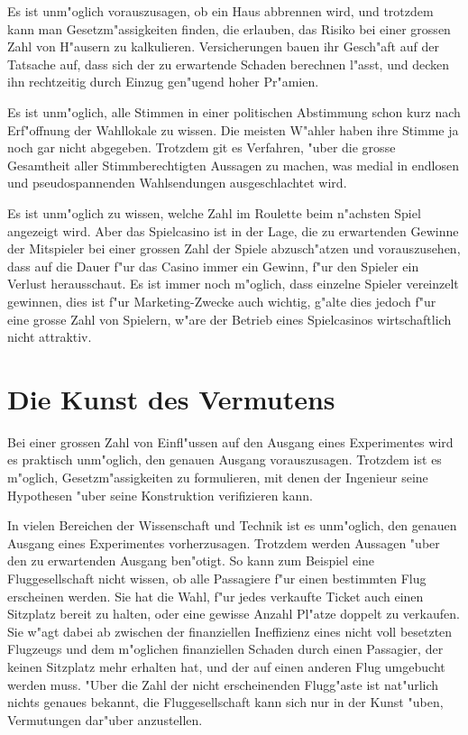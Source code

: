 Es ist unm"oglich vorauszusagen, ob ein Haus abbrennen wird, und
trotzdem kann man Gesetzm"assigkeiten finden, die erlauben, das
Risiko bei einer grossen Zahl von H"ausern zu kalkulieren.
Versicherungen bauen ihr Gesch"aft auf der Tatsache auf, dass
sich der zu erwartende Schaden berechnen l"asst, und decken ihn
rechtzeitig durch Einzug gen"ugend hoher Pr"amien.

Es ist unm"oglich, alle Stimmen in einer politischen Abstimmung
schon kurz nach Erf"offnung der Wahllokale zu wissen. Die meisten
W"ahler haben ihre Stimme ja noch gar nicht abgegeben. Trotzdem git
es Verfahren, "uber die grosse Gesamtheit aller Stimmberechtigten
Aussagen zu machen, was medial in endlosen und pseudospannenden
Wahlsendungen ausgeschlachtet wird.

Es ist unm"oglich zu wissen, welche Zahl im Roulette beim n"achsten
Spiel angezeigt wird. Aber das Spielcasino ist in der Lage, die
zu erwartenden Gewinne der Mitspieler bei einer grossen Zahl der
Spiele abzusch"atzen und vorauszusehen, dass auf die Dauer f"ur
das Casino immer ein Gewinn, f"ur den Spieler ein Verlust herausschaut.
Es ist immer noch m"oglich, dass einzelne Spieler vereinzelt
gewinnen, dies ist f"ur Marketing-Zwecke auch wichtig, g"alte
dies jedoch f"ur eine grosse Zahl von Spielern, w"are der Betrieb
eines Spielcasinos wirtschaftlich nicht attraktiv.

\section*{Die Kunst des Vermutens}
Bei einer grossen Zahl von Einfl"ussen auf den Ausgang eines Experimentes
wird es praktisch unm"oglich, den genauen Ausgang vorauszusagen.
Trotzdem ist es m"oglich, Gesetzm"assigkeiten zu formulieren, mit
denen der Ingenieur seine Hypothesen "uber seine Konstruktion
verifizieren kann.

In vielen Bereichen der Wissenschaft und Technik ist es unm"oglich, den
genauen Ausgang eines Experimentes vorherzusagen. Trotzdem werden
Aussagen "uber den zu erwartenden Ausgang ben"otigt. So kann zum Beispiel
eine Fluggesellschaft nicht wissen, ob alle Passagiere f"ur einen
bestimmten Flug erscheinen werden. Sie hat die Wahl, f"ur jedes verkaufte
Ticket auch einen Sitzplatz bereit zu halten, oder eine gewisse Anzahl
Pl"atze doppelt zu verkaufen. Sie w"agt dabei ab zwischen der finanziellen
Ineffizienz eines nicht voll besetzten Flugzeugs und dem m"oglichen
finanziellen Schaden durch einen Passagier, der keinen Sitzplatz mehr
erhalten hat, und der auf einen anderen Flug umgebucht werden muss.
"Uber die Zahl der nicht erscheinenden Flugg"aste ist nat"urlich nichts
genaues bekannt, die Fluggesellschaft kann sich nur in der Kunst "uben,
Vermutungen dar"uber anzustellen.

